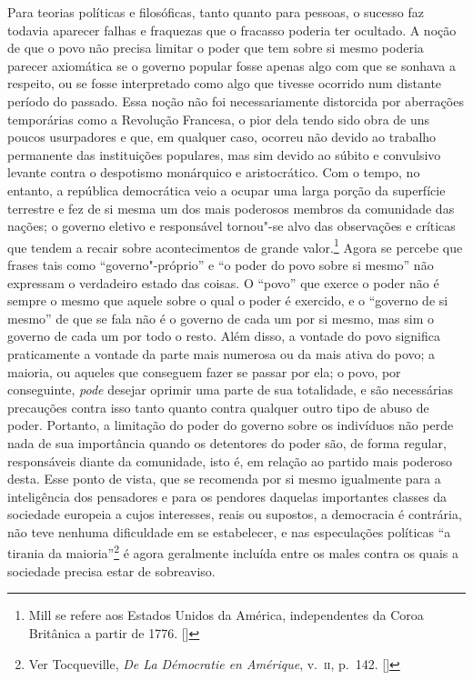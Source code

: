 Para teorias políticas e filosóficas, tanto quanto para pessoas, o
sucesso faz todavia aparecer falhas e fraquezas que o fracasso poderia ter
ocultado. A noção de que o povo não precisa limitar o
poder que tem sobre si mesmo poderia parecer axiomática se o
governo popular fosse apenas algo com que se sonhava a respeito, ou
se fosse interpretado como algo que tivesse ocorrido num distante período do
passado. Essa noção não foi necessariamente distorcida por aberrações
temporárias como a Revolução Francesa, o pior dela tendo sido obra
de uns poucos \mbox{usurpadores} e que, em qualquer caso, ocorreu não devido
ao trabalho permanente das instituições populares, mas sim devido ao
súbito e convulsivo levante contra o despotismo monárquico e
aristocrático. Com o tempo, no entanto, a república
democrática veio a ocupar uma larga porção da superfície terrestre e
fez de si mesma um dos mais poderosos membros da comunidade das nações; 
o governo eletivo e responsável tornou"-se alvo das observações e
críticas que tendem a recair sobre acontecimentos de grande
valor.\footnote{ Mill se refere aos Estados Unidos da América, 
independentes da Coroa Britânica a partir de 1776. []}
 Agora se percebe que frases tais como ``governo"-próprio'' e ``o poder do
povo sobre si mesmo'' não expressam o verdadeiro estado das coisas. O
``povo'' que exerce o poder não é sempre o mesmo que aquele sobre o qual o
poder é exercido, e o ``governo de si mesmo'' de que se fala 
não é o governo de cada um por si mesmo, mas sim o governo de cada um
por todo o resto. Além disso, a vontade do povo significa
praticamente a vontade da parte mais numerosa ou da mais ativa do povo;
a maioria, ou aqueles que conseguem fazer se passar por ela; o povo,
por conseguinte,\textit{ pode} desejar oprimir uma parte de sua 
totalidade, e são necessárias precauções contra isso tanto quanto 
contra qualquer outro tipo de abuso de poder. Portanto, a limitação do
poder do governo sobre os indivíduos não perde nada de sua importância
quando os detentores do poder são, de forma regular, responsáveis
diante da comunidade, isto é, em relação ao partido mais poderoso desta.
Esse ponto de vista, que se recomenda por si mesmo igualmente para a
inteligência dos pensadores e para os pendores daquelas importantes
classes da sociedade \mbox{europeia} a cujos \mbox{interesses}, reais ou supostos, a
democracia é contrária, não teve nenhuma dificuldade em se estabelecer,
e nas especulações políticas ``a tirania da
maioria''\footnote{ Ver Tocqueville, \textit{De La Démocratie en Amérique}, 
v.~\textsc{ii}, p.~142. []}  é agora geralmente incluída entre os males
contra os quais a sociedade precisa estar de sobreaviso. 

